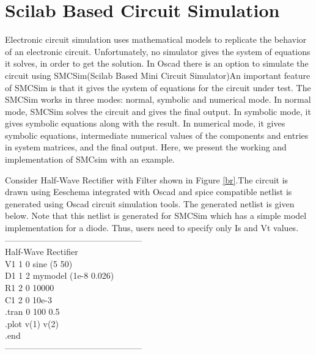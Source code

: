 \chapter {Scilab Based Circuit Simulation}

Electronic circuit simulation uses mathematical models to replicate the behavior of an electronic circuit. Unfortunately, no simulator gives the system of equations it solves, in order to get the solution. In Oscad there is an option to simulate the circuit using SMCSim(Scilab Based Mini Circuit Simulator)An important feature of SMCSim is that it gives the system of equations for the circuit under test. The SMCSim works in three modes: normal, symbolic and numerical mode. In normal mode, SMCSim solves the circuit and gives the final output. In symbolic mode, it gives symbolic equations along with the result. In numerical mode, it gives symbolic equations, intermediate numerical values of the components and entries in system matrices, and the final output. Here, we present the working and implementation of SMCsim with an example. 

Consider Half-Wave Rectifier with Filter shown in Figure \ref{br}.The circuit is drawn using Eeschema integrated with Oscad and spice compatible netlist is generated using Oscad circuit simulation tools. The generated netlist is given below. Note that this netlist is generated for SMCSim which has a simple model implementation for a diode. Thus, users need to specify only Is and Vt values.\\

------------------------------------------------\\ 
Half-Wave Rectifier \\
V1 1 0 sine (5 50) \\
D1 1 2 mymodel (1e-8 0.026)\\ 
R1 2 0 10000 \\
C1 2 0 10e-3 \\
.tran 0 100 0.5\\ 
.plot v(1) v(2) \\
.end \\
------------------------------------------------\\

